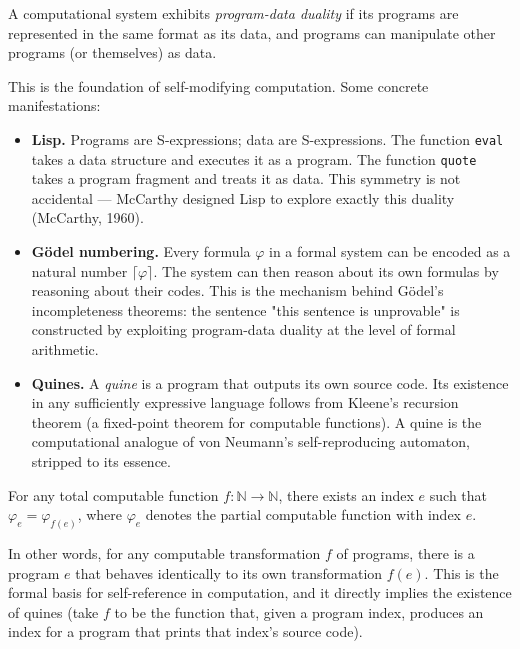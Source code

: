 \begin{definition}
A computational system exhibits \textit{program-data duality} if its programs are represented in the same format as its data, and programs can manipulate other programs (or themselves) as data.

This is the foundation of self-modifying computation. Some concrete manifestations:
\end{definition}

\begin{itemize}
  \item \textbf{Lisp.} Programs are S-expressions; data are S-expressions. The function \texttt{eval} takes a data structure and executes it as a program. The function \texttt{quote} takes a program fragment and treats it as data. This symmetry is not accidental --- McCarthy designed Lisp to explore exactly this duality (McCarthy, 1960).
\end{itemize}

\begin{itemize}
  \item \textbf{Gödel numbering.} Every formula $\varphi$ in a formal system can be encoded as a natural number $\lceil \varphi \rceil$. The system can then reason about its own formulas by reasoning about their codes. This is the mechanism behind Gödel's incompleteness theorems: the sentence "this sentence is unprovable" is constructed by exploiting program-data duality at the level of formal arithmetic.
\end{itemize}

\begin{itemize}
  \item \textbf{Quines.} A \textit{quine} is a program that outputs its own source code. Its existence in any sufficiently expressive language follows from Kleene's recursion theorem (a fixed-point theorem for computable functions). A quine is the computational analogue of von Neumann's self-reproducing automaton, stripped to its essence.
\end{itemize}

\begin{theorem}
For any total computable function $f: \mathbb{N} \to \mathbb{N}$, there exists an index $e$ such that $\varphi_e = \varphi_{f(e)}$, where $\varphi_e$ denotes the partial computable function with index $e$.

In other words, for any computable transformation $f$ of programs, there is a program $e$ that behaves identically to its own transformation $f(e)$. This is the formal basis for self-reference in computation, and it directly implies the existence of quines (take $f$ to be the function that, given a program index, produces an index for a program that prints that index's source code).
\end{theorem}

